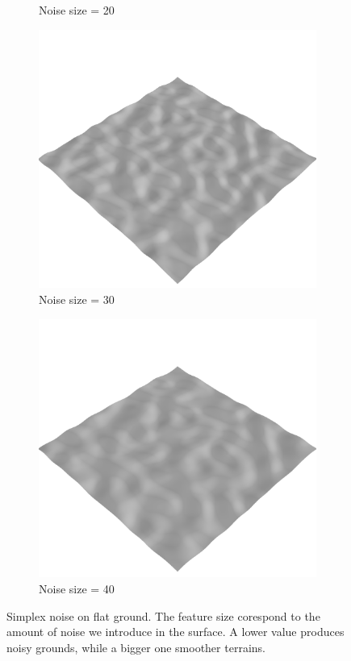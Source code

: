 \documentclass[../document.tex]{subfiles}
\begin{document}
\begin{figure}[htbp]
\begin{subfigure}[b]{0.23\linewidth}
            \caption{Noise size = 20}
            \end{subfigure}    
          \begin{subfigure}[b]{0.23\textwidth}
            \includegraphics[width=\textwidth]{../img/data-aug/3d/simplex3.png}
            \caption{Noise size = 30}
        \end{subfigure}    
        \begin{subfigure}[b]{0.23\textwidth}
            \includegraphics[width=\textwidth]{../img/data-aug/3d/simplex4.png}
            \caption{Noise size = 40}
        \end{subfigure}    
    \caption{Simplex noise on flat ground. The feature size corespond to the amount of noise we introduce in the surface. A lower value produces noisy grounds, while a bigger one smoother terrains.}    
    \label{fig: simplex-noise}

\end{figure}
\end{document}
